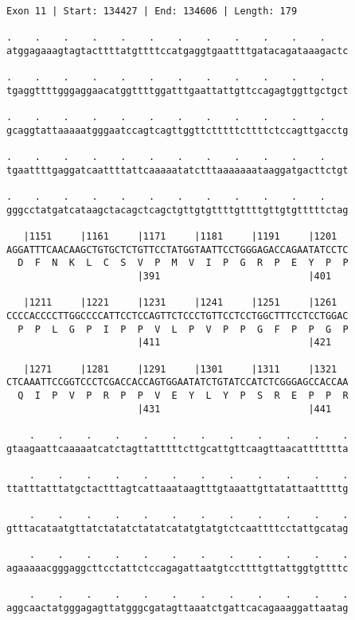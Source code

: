 \documentclass{article}
\begin{document}
\newpage
\begin{Verbatim}
Exon 11 | Start: 134427 | End: 134606 | Length: 179
 
.    .    .    .    .    .    .    .    .    .    .    .    
atggagaaagtagtacttttatgttttccatgaggtgaattttgatacagataaagactc
  
.    .    .    .    .    .    .    .    .    .    .    .    
tgaggttttgggaggaacatggttttggatttgaattattgttccagagtggttgctgct
  
.    .    .    .    .    .    .    .    .    .    .    .    
gcaggtattaaaaatgggaatccagtcagttggttctttttcttttctccagttgacctg
  
.    .    .    .    .    .    .    .    .    .    .    .    
tgaattttgaggatcaattttattcaaaaatatctttaaaaaaataaggatgacttctgt
  
.    .    .    .    .    .    .    .    .    .    .    .    
gggcctatgatcataagctacagctcagctgttgtgttttgttttgttgtgtttttctag
  
   |1151     |1161     |1171     |1181     |1191     |1201  
AGGATTTCAACAAGCTGTGCTCTGTTCCTATGGTAATTCCTGGGAGACCAGAATATCCTC
  D  F  N  K  L  C  S  V  P  M  V  I  P  G  R  P  E  Y  P  P
                       |391                          |401   
  
   |1211     |1221     |1231     |1241     |1251     |1261  
CCCCACCCCTTGGCCCCATTCCTCCAGTTCTCCCTGTTCCTCCTGGCTTTCCTCCTGGAC
  P  P  L  G  P  I  P  P  V  L  P  V  P  P  G  F  P  P  G  P
                       |411                          |421   
  
   |1271     |1281     |1291     |1301     |1311     |1321  
CTCAAATTCCGGTCCCTCGACCACCAGTGGAATATCTGTATCCATCTCGGGAGCCACCAA
  Q  I  P  V  P  R  P  P  V  E  Y  L  Y  P  S  R  E  P  P  R
                       |431                          |441   
  
    .    .    .    .    .    .    .    .    .    .    .    .
gtaagaattcaaaaatcatctagttatttttcttgcattgttcaagttaacattttttta
  
    .    .    .    .    .    .    .    .    .    .    .    .
ttatttatttatgctactttagtcattaaataagtttgtaaattgttatattaatttttg
  
    .    .    .    .    .    .    .    .    .    .    .    .
gtttacataatgttatctatatctatatcatatgtatgtctcaattttcctattgcatag
  
    .    .    .    .    .    .    .    .    .    .    .    .
agaaaaacgggaggcttcctattctccagagattaatgtccttttgttattggtgttttc
  
    .    .    .    .    .    .    .    .    .    .    .    .
aggcaactatgggagagttatgggcgatagttaaatctgattcacagaaaggattaatag
\end{Verbatim}
\end{document}

